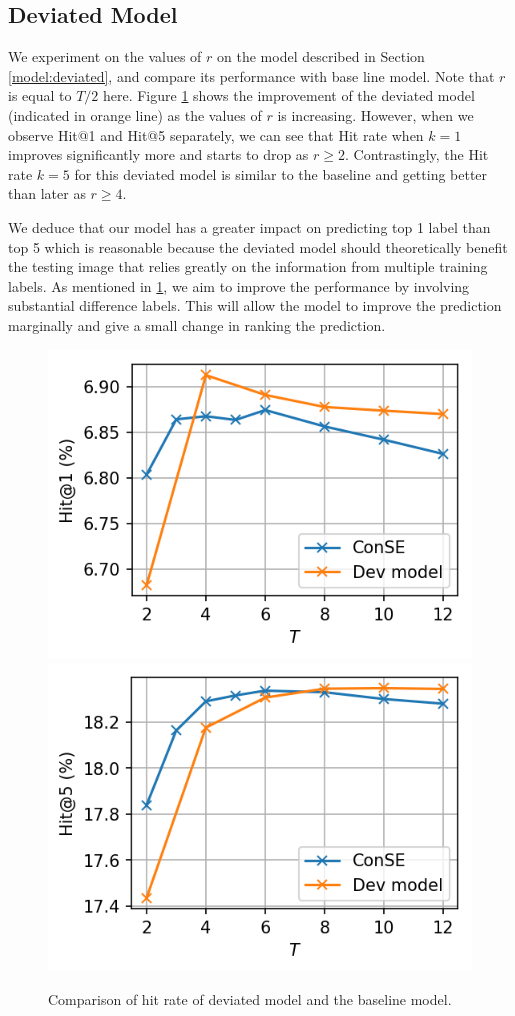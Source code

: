 \documentclass[11pt,letterpaper]{article}
\begin{document}
\subsection{Deviated Model}
We experiment on the values of $r$ on the model described in Section \ref{model:deviated}, and compare its performance with base line model. Note that $r$ is equal to $T/2$ here. Figure \ref{fig:m3plot} shows the improvement of the deviated model (indicated in orange line) as the values of $r$ is increasing. However, when we observe Hit@1 and Hit@5 separately, we can see that Hit rate when $k=1$ improves significantly more and starts to drop as $r \geq 2$. Contrastingly, the Hit rate $k = 5$ for this deviated model is similar to the baseline and getting better than later as $r \geq 4$.    

We deduce that our model has a greater impact on predicting top 1 label than top 5 which is reasonable because the deviated model should theoretically benefit the testing image that relies greatly on the information from multiple training labels. As mentioned in \ref{fig:m3plot}, we aim to improve the performance by involving substantial difference labels. This will allow the model to improve the prediction marginally and give a small change in ranking the prediction. 

\begin{figure}[ht]
\centering
\includegraphics[width=0.48\columnwidth]{model3_k1.png} \hfill
\includegraphics[width=0.48\columnwidth]{model3_k5.png} 
\caption{Comparison of hit rate of deviated model and the baseline model.}
\label{fig:m3plot}
\end{figure}
\end{document}
